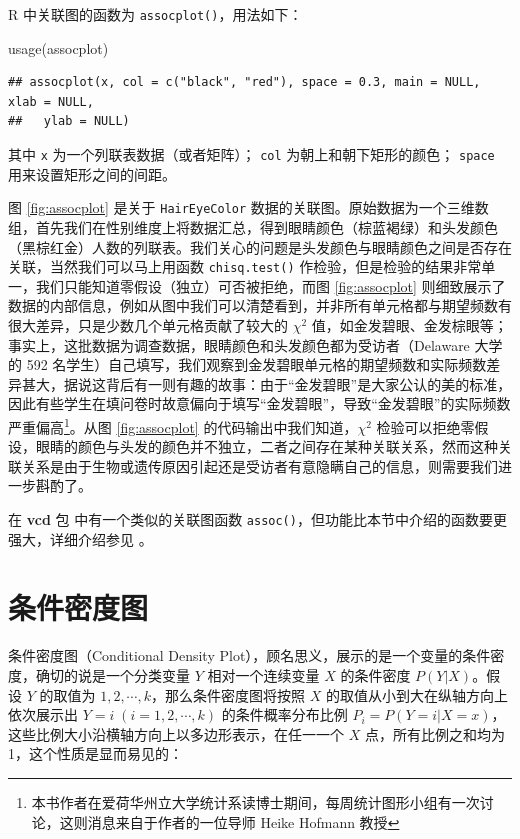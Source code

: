 \documentclass[
  b5paper,
  UTF8,twoside]{book}
\newenvironment{Shaded}{\begin{snugshade}}{\end{snugshade}}
\newcommand{\FunctionTok}[1]{\textcolor[rgb]{0.00,0.00,0.00}{#1}}
\newcommand{\NormalTok}[1]{#1}
\begin{document}
R 中关联图的函数为 \texttt{assocplot()}，用法如下：

\begin{Shaded}
\begin{Highlighting}[]
\FunctionTok{usage}\NormalTok{(assocplot)}
\end{Highlighting}
\end{Shaded}

\begin{verbatim}
## assocplot(x, col = c("black", "red"), space = 0.3, main = NULL, xlab = NULL,
##   ylab = NULL)
\end{verbatim}

其中 \texttt{x} 为一个列联表数据（或者矩阵）； \texttt{col} 为朝上和朝下矩形的颜色； \texttt{space} 用来设置矩形之间的间距。

图 \ref{fig:assocplot}
是关于 \texttt{HairEyeColor} 数据的关联图。原始数据为一个三维数组，首先我们在性别维度上将数据汇总，得到眼睛颜色（棕蓝褐绿）和头发颜色（黑棕红金）人数的列联表。我们关心的问题是头发颜色与眼睛颜色之间是否存在关联，当然我们可以马上用函数 \texttt{chisq.test()} 作检验，但是检验的结果非常单一，我们只能知道零假设（独立）可否被拒绝，而图 \ref{fig:assocplot} 则细致展示了数据的内部信息，例如从图中我们可以清楚看到，并非所有单元格都与期望频数有很大差异，只是少数几个单元格贡献了较大的 \(\chi^{2}\) 值，如金发碧眼、金发棕眼等；事实上，这批数据为调查数据，眼睛颜色和头发颜色都为受访者（Delaware 大学的 592 名学生）自己填写，我们观察到金发碧眼单元格的期望频数和实际频数差异甚大，据说这背后有一则有趣的故事：由于``金发碧眼''是大家公认的美的标准，因此有些学生在填问卷时故意偏向于填写``金发碧眼''，导致``金发碧眼''的实际频数严重偏高\footnote{本书作者在爱荷华州立大学统计系读博士期间，每周统计图形小组有一次讨论，这则消息来自于作者的一位导师 Heike Hofmann 教授}。从图 \ref{fig:assocplot} 的代码输出中我们知道，\(\chi^{2}\) 检验可以拒绝零假设，眼睛的颜色与头发的颜色并不独立，二者之间存在某种关联关系，然而这种关联关系是由于生物或遗传原因引起还是受访者有意隐瞒自己的信息，则需要我们进一步斟酌了。

在 \textbf{vcd} 包 \citep{vcd} 中有一个类似的关联图函数 \texttt{assoc()}，但功能比本节中介绍的函数要更强大，详细介绍参见 \citeauthor{Meyer06} \citetext{\citeyear{Meyer06}; \citealp{Zeileis07}}。

\hypertarget{sec:cdplot}{%
\section{条件密度图}\label{sec:cdplot}}

条件密度图（Conditional Density Plot），顾名思义，展示的是一个变量的条件密度，确切的说是一个分类变量 \(Y\) 相对一个连续变量 \(X\) 的条件密度 \(P(Y|X)\)。假设 \(Y\) 的取值为 \(1,2,\cdots,k\)，那么条件密度图将按照 \(X\) 的取值从小到大在纵轴方向上依次展示出 \(Y=i\;(i=1,2,\cdots,k)\) 的条件概率分布比例 \(P_{i}=P(Y=i|X=x)\)，这些比例大小沿横轴方向上以多边形表示，在任一一个 \(X\) 点，所有比例之和均为 1，这个性质是显而易见的：
\end{document}
